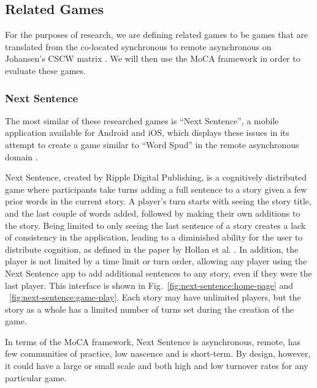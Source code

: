 \documentclass{sigchi}
\begin{document}
\subsection{Related Games}
For the purposes of research, we are defining related games to be games that are translated from the co-located synchronous to remote asynchronous on Johansen's CSCW matrix \cite{cscw-matrix}. We will then use the MoCA framework \cite{MoCA} in order to evaluate these games.

\subsubsection{Next Sentence}
The most similar of these researched games is ``Next Sentence'', a mobile application available for Android and iOS, which displays these issues in its attempt to create a game similar to ``Word Spud'' in the remote asynchronous domain \cite{next-sentence, word-spud}. 

Next Sentence, created by Ripple Digital Publishing, is a cognitively distributed game where participants take turns adding a full sentence to a story given a few prior words in the current story\cite{next-sentence-how}. A player's turn starts with seeing the story title, and the last couple of words added, followed by making their own additions to the story. Being limited to only seeing the last sentence of a story creates a lack of consistency in the application, leading to a diminished ability for the user to distribute cognition, as defined in the paper by Hollan et al. \cite{distributed-cognition}. In addition, the player is not limited by a time limit or turn order, allowing any player using the Next Sentence app to add additional sentences to any story, even if they were the last player. This interface is shown in Fig.\@~\ref{fig:next-sentence:home-page} and \@~\ref{fig:next-sentence:game-play}. Each story may have unlimited players, but the story as a whole has a limited number of turns set during the creation of the game.


In terms of the MoCA framework, Next Sentence is asynchronous, remote, has few communities of practice, low nascence and is short-term. By design, however, it could have a large or small scale and both high and low turnover rates for any particular game.
\newline
\newline
\end{document}
